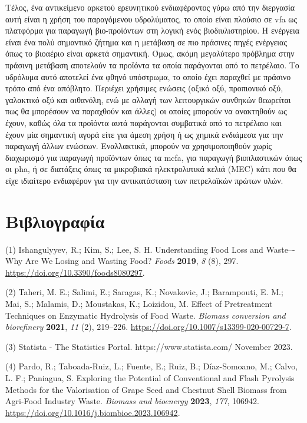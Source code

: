 \documentclass[11pt]{report}
\begin{document}
Τέλος, ένα αντικείμενο αρκετού ερευνητικού ενδιαφέροντος γύρω από την διεργασία αυτή είναι η χρήση του παραγόμενου υδρολύματος, το οποίο είναι πλούσιο σε \acrfull{vfa} ως πλατφόρμα για παραγωγή βιο-προϊόντων στη λογική ενός βιοδιυλιστηρίου. Η ενέργεια είναι ένα πολύ σημαντικό ζήτημα και η μετάβαση σε πιο πράσινες πηγές ενέργειας όπως το βιοαέριο είναι αρκετά σημαντική. Όμως, ακόμη μεγαλύτερο πρόβλημα στην πράσινη μετάβαση αποτελούν τα προϊόντα τα οποία παράγονται από το πετρέλαιο. Το υδρόλυμα αυτό αποτελεί ένα φθηνό υπόστρωμα, το οποίο έχει παραχθεί με πράσινο τρόπο από ένα απόβλητο. Περιέχει χρήσιμες ενώσεις (οξικό οξύ, προπιονικό οξύ, γαλακτικό οξύ και αιθανόλη, ενώ με αλλαγή των λειτουργικών συνθηκών θεωρείται πως θα μπορέσουν να παραχθούν και άλλες) οι οποίες μπορούν να ανακτηθούν ως έχουν, καθώς όλα τα προϊόντα αυτά παράγονται συμβατικά από το πετρέλαιο και έχουν μία σημαντική αγορά είτε για άμεση χρήση ή ως χημικά ενδιάμεσα για την παραγωγή άλλων ενώσεων. Εναλλακτικά, μπορούν να χρησιμοποιηθούν χωρίς διαχωρισμό για παραγωγή προϊόντων όπως τα \acrfull{mcfa}, για παραγωγή βιοπλαστικών όπως οι \acrfull{pha}, ή σε διατάξεις όπως τα μικροβιακά ηλεκτρολυτικά κελιά (MEC) κάτι που θα είχε ιδιαίτερο ενδιαφέρον για την αντικατάσταση των πετρελαϊκών πρώτων υλών.

\part*{Βιβλιογραφία}
\label{sec:org9935f67}
\hypertarget{citeproc_bib_item_1}{(1) Ishangulyyev, R.; Kim, S.; Lee, S. H. Understanding Food Loss and Waste–-Why Are We Losing and Wasting Food? \textit{Foods} \textbf{2019}, \textit{8} (8), 297. \url{https://doi.org/10.3390/foods8080297}.}

\hypertarget{citeproc_bib_item_2}{(2) Taheri, M. E.; Salimi, E.; Saragas, K.; Novakovic, J.; Barampouti, E. M.; Mai, S.; Malamis, D.; Moustakas, K.; Loizidou, M. Effect of Pretreatment Techniques on Enzymatic Hydrolysis of Food Waste. \textit{Biomass conversion and biorefinery} \textbf{2021}, \textit{11} (2), 219–226. \url{https://doi.org/10.1007/s13399-020-00729-7}.}

\hypertarget{citeproc_bib_item_3}{(3) Statista - The Statistics Portal. https://www.statista.com/ November 2023.}

\hypertarget{citeproc_bib_item_4}{(4) Pardo, R.; Taboada-Ruiz, L.; Fuente, E.; Ruiz, B.; Díaz-Somoano, M.; Calvo, L. F.; Paniagua, S. Exploring the Potential of Conventional and Flash Pyrolysis Methods for the Valorisation of Grape Seed and Chestnut Shell Biomass from Agri-Food Industry Waste. \textit{Biomass and bioenergy} \textbf{2023}, \textit{177}, 106942. \url{https://doi.org/10.1016/j.biombioe.2023.106942}.}
\end{document}

